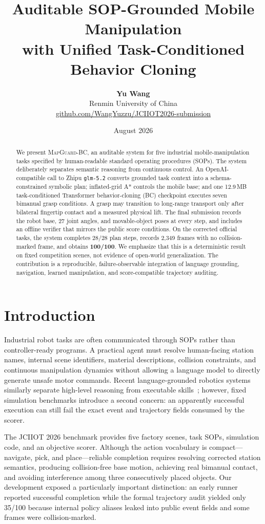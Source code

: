 \documentclass[10pt,twocolumn]{article}
\title{\vspace{-9mm}\textbf{Auditable SOP-Grounded Mobile Manipulation\\with Unified Task-Conditioned Behavior Cloning}}
\author{\textbf{Yu Wang}\\[-1mm]
\small Renmin University of China\\[-1mm]
\small\href{https://github.com/WangYuzzu/JCIIOT2026-submission}{github.com/WangYuzzu/JCIIOT2026-submission}}
\date{August 2026}
\newcommand{\method}{\textsc{MapGuard-BC}}
\newcommand{\code}[1]{\texttt{#1}}
\newcommand{\score}{\textbf{100/100}}
\begin{document}
\maketitle
\vspace{-5mm}

\begin{abstract}
We present \method, an auditable system for five industrial mobile-manipulation tasks specified by human-readable standard operating procedures (SOPs). The system deliberately separates semantic reasoning from continuous control. An OpenAI-compatible call to Zhipu \code{glm-5.2} converts grounded task context into a schema-constrained symbolic plan; inflated-grid A* controls the mobile base; and one 12.9\,MB task-conditioned Transformer behavior-cloning (BC) checkpoint executes seven bimanual grasp conditions. A grasp may transition to long-range transport only after bilateral fingertip contact and a measured physical lift. The final submission records the robot base, 27 joint angles, and movable-object poses at every step, and includes an offline verifier that mirrors the public score conditions. On the corrected official tasks, the system completes 28/28 plan steps, records 2,349 frames with no collision-marked frame, and obtains \score. We emphasize that this is a deterministic result on fixed competition scenes, not evidence of open-world generalization. The contribution is a reproducible, failure-observable integration of language grounding, navigation, learned manipulation, and score-compatible trajectory auditing.
\end{abstract}
\small

\section{Introduction}

Industrial robot tasks are often communicated through SOPs rather than controller-ready programs. A practical agent must resolve human-facing station names, internal scene identifiers, material descriptions, collision constraints, and continuous manipulation dynamics without allowing a language model to directly generate unsafe motor commands. Recent language-grounded robotics systems similarly separate high-level reasoning from executable skills~\citep{ahn2022saycan,liang2023code}; however, fixed simulation benchmarks introduce a second concern: an apparently successful execution can still fail the exact event and trajectory fields consumed by the scorer.

The JCIIOT 2026 benchmark provides five factory scenes, task SOPs, simulation code, and an objective scorer. Although the action vocabulary is compact---navigate, pick, and place---reliable completion requires resolving corrected station semantics, producing collision-free base motion, achieving real bimanual contact, and avoiding interference among three consecutively placed objects. Our development exposed a particularly important distinction: an early runner reported successful completion while the formal trajectory audit yielded only 35/100 because internal policy aliases leaked into public event fields and some frames were collision-marked.
\end{document}
